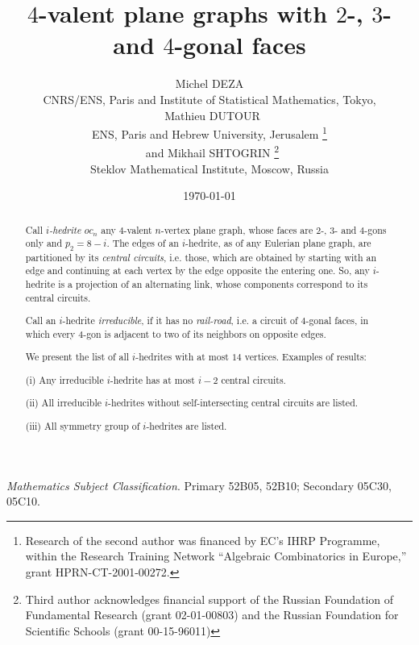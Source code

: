 \documentclass[12pt]{article}
\begin{document}
\title{$4$-valent plane graphs with $2$-, $3$- and $4$-gonal faces}


\author{Michel DEZA \\
  CNRS/ENS, Paris and Institute of Statistical Mathematics, 
Tokyo,\\
\ Mathieu DUTOUR \\
 ENS, Paris and Hebrew University, Jerusalem
\footnote{Research of the second author was financed by EC's IHRP Programme, within the Research Training Network ``Algebraic Combinatorics in Europe,'' grant HPRN-CT-2001-00272.}\\
\ and  Mikhail SHTOGRIN \thanks{Third author acknowledges financial support 
of the Russian Foundation of Fundamental Research (grant 02-01-00803)
and the Russian Foundation for Scientific Schools (grant 00-15-96011)}\\
Steklov Mathematical Institute, Moscow, Russia} 
\date{\today}

\maketitle



\begin{abstract}
Call {\em $i$-hedrite $oc_n$} any $4$-valent $n$-vertex plane graph, whose 
faces are $2$-, $3$- and $4$-gons only and $p_2=8-i$. The edges of an $i$-hedrite, as of 
any Eulerian plane graph, are partitioned
by its {\em central circuits}, i.e. those, which are obtained by starting with an
edge and continuing at each vertex by the edge opposite the entering one. 
So, any $i$-hedrite is a projection of an alternating link, whose components
correspond to its central circuits.

Call an $i$-hedrite {\em irreducible}, if it has no 
{\em rail-road}, i.e. a 
circuit of $4$-gonal faces, in which every $4$-gon is adjacent to two of its 
neighbors on opposite edges.

We present the list of all $i$-hedrites with at most $14$ vertices. Examples of results: 

(i) Any irreducible $i$-hedrite has at most $i-2$ central circuits.

(ii) All irreducible $i$-hedrites without self-intersecting central circuits are listed.

(iii) All symmetry group of $i$-hedrites are listed.

\end{abstract}

{\em Mathematics Subject Classification}. Primary 52B05, 52B10;
Secondary 05C30, 05C10.
\end{document}
